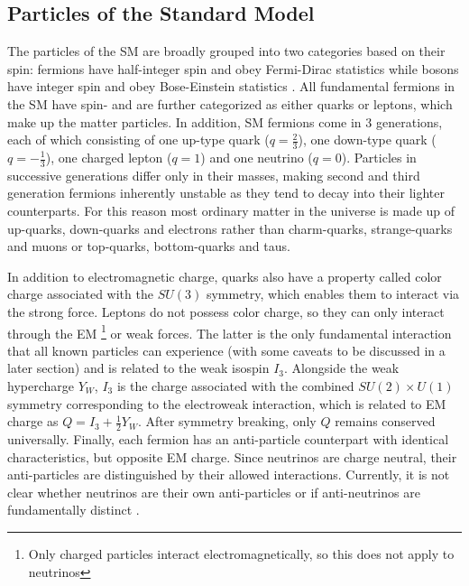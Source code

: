 \subsection{Particles of the Standard Model}

The particles of the SM are broadly grouped into two categories based on their spin: fermions have half-integer 
spin and obey Fermi-Dirac statistics \cite{dirac-fd-statistics} while bosons have integer spin and 
obey Bose-Einstein statistics \cite{bose-be-statistics}. All fundamental fermions in the SM have 
spin- and are further categorized as either quarks or leptons, which make up the matter particles. 
In addition, SM fermions come in 3 generations, each of which consisting of one up-type quark ($q=\frac{2}{3}$), 
one down-type quark ($q=-\frac{1}{3}$), one charged lepton ($q=1$) and one neutrino ($q=0$). Particles in 
successive generations differ only in their masses, making second and third generation fermions inherently 
unstable as they tend to decay into their lighter counterparts. For this reason most ordinary matter in the 
universe is made up of up-quarks, down-quarks and electrons rather than charm-quarks, strange-quarks 
and muons or top-quarks, bottom-quarks and taus. \par

In addition to electromagnetic charge, quarks also have a property called color charge associated with the 
$SU(3)$ symmetry, which enables them to interact via the strong force. Leptons do not possess color charge, 
so they can only interact through the EM \footnote{Only charged particles interact electromagnetically, so this 
does not apply to neutrinos} or weak forces. The latter is the only fundamental interaction that all known particles 
can experience (with some caveats to be discussed in a later section) and is related to the weak isospin $I_3$. 
Alongside the weak hypercharge $Y_W$, $I_3$ is the charge associated with the combined $SU(2) \times U(1)$ 
symmetry corresponding to the electroweak interaction, which is related to EM charge as 
$Q = I_3 + \frac{1}{2}Y_W$. After symmetry breaking, only $Q$ remains conserved universally. Finally, each 
fermion has an anti-particle counterpart with identical characteristics, but opposite EM charge. Since neutrinos 
are charge neutral, their anti-particles are distinguished by their allowed interactions. Currently, it is not clear 
whether neutrinos are their own anti-particles or if anti-neutrinos are fundamentally distinct 
\cite{avignone-majorana-neutrinos}.\par

